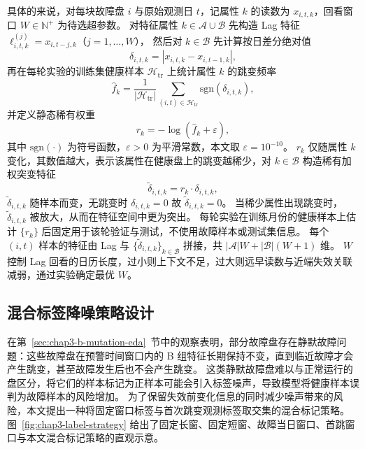 具体的来说，对每块故障盘 $i$ 与原始观测日 $t$，记属性 $k$ 的读数为 $x_{i,t,k}$，回看窗口 $W\in\mathbb{N}^{+}$ 为待选超参数。
对特征属性 $k\in\mathcal{A}\cup\mathcal{B}$ 先构造 Lag 特征 $\ell^{(j)}_{i,t,k}=x_{i,t-j,k}$（$j=1,\ldots,W$），
然后对 $k\in\mathcal{B}$ 先计算按日差分绝对值
\begin{equation}
\label{equ:mutation-delta}
\delta_{i,t,k}=\left|x_{i,t,k}-x_{i,t-1,k}\right|,
\end{equation}
再在每轮实验的训练集健康样本 $\mathcal{H}_{\mathrm{tr}}$ 上统计属性 $k$ 的跳变频率
\begin{equation}
\label{equ:mutation-freq}
\hat{f}_k=\frac{1}{|\mathcal{H}_{\mathrm{tr}}|}\sum_{(i,t)\in\mathcal{H}_{\mathrm{tr}}}\mathrm{sgn}\!\left(\delta_{i,t,k}\right),
\end{equation}
并定义静态稀有权重
\begin{equation}
\label{equ:mutation-rarity}
r_k=-\log\!\left(\hat{f}_k+\varepsilon\right),
\end{equation}
其中 $\mathrm{sgn}(\cdot)$ 为符号函数，$\varepsilon>0$ 为平滑常数，本文取 $\varepsilon=10^{-10}$。
$r_k$ 仅随属性 $k$ 变化，其数值越大，表示该属性在健康盘上的跳变越稀少，对 $k\in\mathcal{B}$ 构造稀有加权突变特征
\begin{equation}
\label{equ:mutation-weighted}
\tilde{\delta}_{i,t,k}=r_k\cdot\delta_{i,t,k},
\end{equation}
$\tilde{\delta}_{i,t,k}$ 随样本而变，无跳变时 $\delta_{i,t,k}=0$ 故 $\tilde{\delta}_{i,t,k}=0$。
当稀少属性出现跳变时，$\tilde{\delta}_{i,t,k}$ 被放大，从而在特征空间中更为突出。
每轮实验在训练月份的健康样本上估计 $\{r_k\}$ 后固定用于该轮验证与测试，不使用故障样本或测试集信息。
每个 $(i,t)$ 样本的特征由 Lag 与 $\{\tilde{\delta}_{i,t,k}\}_{k\in\mathcal{B}}$ 拼接，共 $|\mathcal{A}|W+|\mathcal{B}|(W+1)$ 维。
$W$ 控制 Lag 回看的日历长度，过小则上下文不足，过大则远早读数与近端失效关联减弱，通过实验确定最优 $W$。

\subsection{混合标签降噪策略设计}
\label{sec:chap3-jump-label}

在第~\ref{sec:chap3-b-mutation-eda}~节中的观察表明，部分故障盘存在静默故障问题：这些故障盘在预警时间窗口内的 B 组特征长期保持不变，直到临近故障才会产生跳变，甚至故障发生后也不会产生跳变。
这类静默故障盘难以与正常运行的盘区分，将它们的样本标记为正样本可能会引入标签噪声，导致模型将健康样本误判为故障样本的风险增加。
为了保留失效前变化信息的同时减少噪声带来的风险，本文提出一种将固定窗口标签与首次跳变观测标签取交集的混合标记策略。
图~\ref{fig:chap3-label-strategy} 给出了固定长窗、固定短窗、故障当日窗口、首跳窗口与本文混合标记策略的直观示意。

